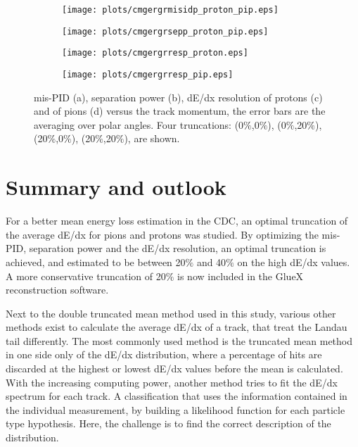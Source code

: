 \begin{figure}[H]
    \centering
    \begin{subfigure}[b]{0.5\textwidth}
        \texttt{[image: plots/cmgergrmisidp\_proton\_pip.eps]}
        \caption{}
        \label{fig.3.8.a} 
    \end{subfigure}\hfill
    \begin{subfigure}[b]{0.5\textwidth}
        \texttt{[image: plots/cmgergrsepp\_proton\_pip.eps]}
        \caption{}
        \label{fig.3.8.b} 
    \end{subfigure}\hfill
    \begin{subfigure}[b]{0.5\textwidth}
        \texttt{[image: plots/cmgergrresp\_proton.eps]}
        \caption{}
        \label{fig.3.8.c} 
    \end{subfigure}\hfill
    \begin{subfigure}[b]{0.5\textwidth}
        \texttt{[image: plots/cmgergrresp\_pip.eps]}
        \caption{}
        \label{fig.3.8.d}
    \end{subfigure}
    \caption{mis-PID (a), separation power (b), dE/dx resolution of protons (c) and of pions (d) versus the track momentum, the error bars are the averaging over polar angles. Four truncations: (0$\%$,0$\%$), (0$\%$,20$\%$),(20$\%$,0$\%$), (20$\%$,20$\%$), are shown.}
    \label{fig.3.8}
\end{figure}

\section{Summary and outlook}
\label{p.3.4}

For a better mean energy loss estimation in the CDC, an optimal truncation of the average dE/dx for pions and protons was studied. By optimizing the mis-PID, separation power and the dE/dx resolution, an optimal truncation is achieved, and estimated to be between 20$\%$ and 40$\%$ on the high dE/dx values. A more conservative truncation of 20$\%$ is now included in the GlueX reconstruction software.
~\par Next to the double truncated mean method used in this study, various other methods exist to calculate the average dE/dx of a track, that treat the Landau tail differently. The most commonly used method is the truncated mean method in one side only of the dE/dx distribution, where a percentage of hits are discarded at the highest or lowest dE/dx values before the mean is calculated. With the increasing computing power, another method tries to fit the dE/dx spectrum for each track. A classification that uses the information contained in the individual measurement, by building a likelihood function for each particle type hypothesis. Here, the challenge is to find the correct description of the distribution.
